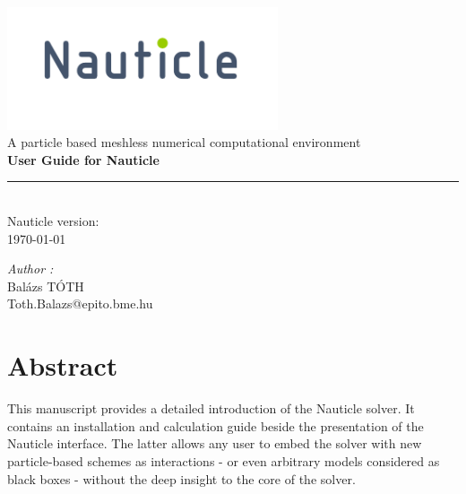 \documentclass[a4paper,12pt,openany]{book}
\theoremstyle{break}
\begin{document}
\frontmatter
\begin{titlepage}
\begin{center}
\vspace{5cm}
\includegraphics[width=0.6\textwidth]{nauticle_logo.pdf}\\[0.5cm]
{\large A particle based meshless numerical computational environment}\\ [5cm]
{ \huge \bfseries User Guide for Nauticle \\[0.2cm] }
\color{nauticlegreen}
\rule{\linewidth}{1.5mm} \\[0.5cm]
\color{black}
{\large Nauticle version: \nauticleversion{} \\ \today}
\vfill
\noindent
\begin{minipage}{1\textwidth}
  \begin{flushright} \large
    \emph{Author :}\\
    Balázs TÓTH \\
    Toth.Balazs@epito.bme.hu
  \end{flushright}
\end{minipage}
\end{center}
\end{titlepage}
\clearpage\mbox{}\clearpage
\chapter{Abstract}
This manuscript provides a detailed introduction of the Nauticle solver. It contains an installation and calculation guide beside the presentation of the Nauticle interface. The latter allows any user to embed the solver with new particle-based schemes as interactions - or even arbitrary models considered as black boxes - without the deep insight to the core of the solver.

\tableofcontents
\newpage
\mainmatter

\raggedbottom
\end{document}
